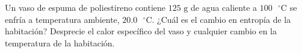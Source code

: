 \item Un vaso de espuma de poliestireno contiene $125\text{ g}$ de agua caliente a $100\text{ }^\circ\text{C}$ se enfría a temperatura ambiente, $20.0\text{ }^\circ\text{C}$. ¿Cuál es el cambio en entropía de la habitación? Desprecie el calor específico del vaso y cualquier cambio en la temperatura de la habitación.
